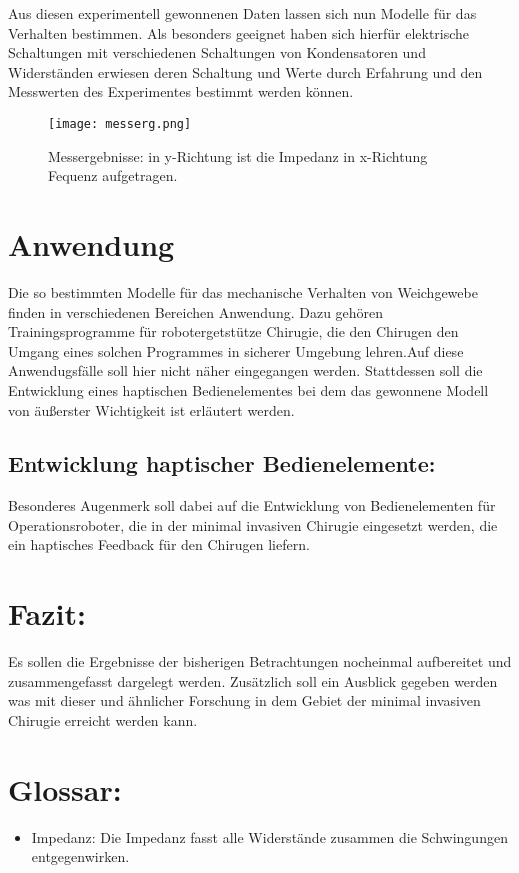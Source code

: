 \documentclass[11pt]{article}
\begin{document}
		 Aus diesen experimentell gewonnenen Daten lassen sich nun Modelle für das Verhalten 
		 bestimmen. Als besonders geeignet haben sich hierfür elektrische Schaltungen mit 
		 verschiedenen Schaltungen von Kondensatoren und Widerständen erwiesen deren Schaltung 
		 und Werte durch Erfahrung und den Messwerten des Experimentes bestimmt werden können.
		  
		 
		 \begin{figure}[h!]
		  \centering
			\texttt{[image: messerg.png]}
			\caption{Messergebnisse: in y-Richtung ist die Impedanz in x-Richtung Fequenz aufgetragen.}
		\end{figure} 
		
	\section{Anwendung}
		Die so bestimmten Modelle für das mechanische Verhalten von Weichgewebe finden in 
		verschiedenen Bereichen Anwendung. Dazu gehören Trainingsprogramme für robotergetstütze
		Chirugie, die den Chirugen den Umgang eines solchen Programmes in sicherer Umgebung 
		lehren.Auf diese Anwendugsfälle soll hier nicht näher eingegangen werden. Stattdessen
		soll die Entwicklung eines haptischen Bedienelementes bei dem das gewonnene Modell von
		äußerster Wichtigkeit ist erläutert werden.
		 
		\subsection{Entwicklung haptischer Bedienelemente:}
			Besonderes Augenmerk soll dabei auf die Entwicklung von Bedienelementen für 
			Operationsroboter, die in der minimal invasiven Chirugie eingesetzt werden, die 
			ein haptisches Feedback für den Chirugen liefern.

			
	\section{Fazit:}
			Es sollen die Ergebnisse der bisherigen Betrachtungen nocheinmal aufbereitet und 
			zusammengefasst dargelegt werden. Zusätzlich soll ein Ausblick gegeben werden was 
			mit dieser und ähnlicher Forschung in dem Gebiet der minimal invasiven Chirugie erreicht
			werden kann. 
			
	\section{Glossar:}
	\begin{itemize}
		\item Impedanz: Die Impedanz fasst alle Widerstände zusammen die Schwingungen entgegenwirken.
	\end{itemize}
			 
		  
\end{document}
